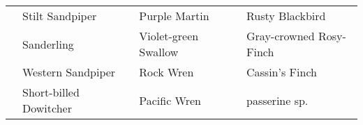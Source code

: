 \documentclass{article}
\begin{document}
\begin{center}
\begin{tabularx}{\textwidth}{cXcXcX}
\underline{\hspace{3ex}} 	 &Stilt Sandpiper 	 &\underline{\hspace{3ex}} 	 &Purple Martin 	 &\underline{\hspace{3ex}} 	 &Rusty Blackbird \\ 
\underline{\hspace{3ex}} 	 &Sanderling 	 &\underline{\hspace{3ex}} 	 &Violet-green Swallow 	 &\underline{\hspace{3ex}} 	 &Gray-crowned Rosy-Finch \\ 
\underline{\hspace{3ex}} 	 &Western Sandpiper 	 &\underline{\hspace{3ex}} 	 &Rock Wren 	 &\underline{\hspace{3ex}} 	 &Cassin's Finch \\ 
\underline{\hspace{3ex}} 	 &Short-billed Dowitcher 	 &\underline{\hspace{3ex}} 	 &Pacific Wren 	 &\underline{\hspace{3ex}} 	 &passerine sp. \\ 
\hline
\end{tabularx} 
\end{center}
\end{document}
